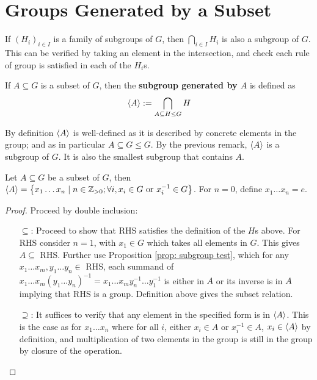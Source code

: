 \section{Groups Generated by a Subset}

\begin{remark}
    If $(H_i)_{i \in I}$ is a family of subgroups of $G$, then $\bigcap_{i \in I} H_i$ is also a subgroup of $G$. This can be verified by taking an element in the intersection, and check each rule of group is satisfied in each of the $H_i$s.
\end{remark}

\begin{definition}
    If $A \subseteq G$ is a subset of $G$, then the \textbf{subgroup generated by $A$} is defined as
    \[
        \left\langle A \right\rangle := \bigcap_{A \subseteq H \leq G} H
    \]
\end{definition}

\begin{remark}
    By definition $\left\langle A \right\rangle$ is well-defined as it is described by concrete elements in the group; and as in particular $A \subseteq G \leq G$. By the previous remark, $\left\langle A \right\rangle$ is a subgroup of $G$. It is also the smallest subgroup that contains $A$.
\end{remark}

\begin{proposition}\label{prop: explicit presentation of generated subgroup}
    Let $A \subseteq G$ be a subset of $G$, then $\left\langle A \right\rangle = \left\{ x_1\dots x_n \mid n \in \mathbb{Z}_{>0}; \forall i, x_i \in G \text{ or } x_i^{-1} \in G \right\}$. For $n = 0$, define $x_1 \dots x_n = e$. 
\end{proposition}

\begin{proof}
    Proceed by double inclusion:
    \begin{enumerate}
        \item[$\subseteq$:] Proceed to show that RHS satisfies the definition of the $H$s above. For RHS consider $n = 1$, with $x_1 \in G$ which takes all elements in $G$. This gives $A \subseteq$ RHS. Further use Proposition \ref{prop: subgroup test}, which for any $x_1\dots x_m, y_1\dots y_n \in$ RHS, each summand of $x_1 \dots x_m (y_1 \dots y_n)^{-1} = x_1 \dots x_m y_n^{-1} \dots y_1^{-1}$ is either in $A$ or its inverse is in $A$ implying that RHS is a group. Definition above gives the subset relation.
        \item[$\supseteq$:] It suffices to verify that any element in the specified form is in $\left\langle A \right\rangle$. This is the case as for $x_1\dots x_n$ where for all $i$, either $x_i \in A$ or $x_i^{-1} \in A$, $x_i \in \left\langle A \right\rangle$ by definition, and multiplication of two elements in the group is still in the group by closure of the operation.  
    \end{enumerate}
\end{proof}

